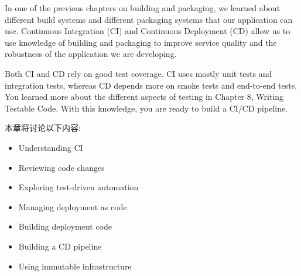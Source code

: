 

In one of the previous chapters on building and packaging, we learned about different build systems and different packaging systems that our application can use. Continuous Integration (CI) and Continuous Deployment (CD) allow us to use knowledge of building and packaging to improve service quality and the robustness of the application we are developing.

Both CI and CD rely on good test coverage. CI uses mostly unit tests and integration tests, whereas CD depends more on smoke tests and end-to-end tests. You learned more about the different aspects of testing in Chapter 8, Writing Testable Code. With this knowledge, you are ready to build a CI/CD pipeline.

本章将讨论以下内容:

\begin{itemize}
\item 
Understanding CI

\item 
Reviewing code changes

\item 
Exploring test-driven automation

\item 
Managing deployment as code

\item 
Building deployment code

\item 
Building a CD pipeline

\item 
Using immutable infrastructure
\end{itemize}